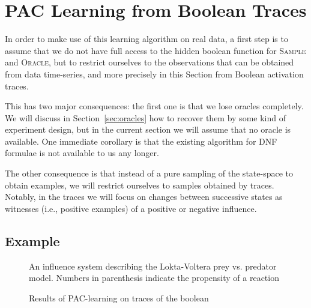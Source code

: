 \documentclass{llncs}
\newcommand{\sylvain}[1]{\textcolor{green}{#1}}
\begin{document}




\section{PAC Learning from Boolean Traces}

In order to make use of this learning algorithm on real data, a first step is
to assume that we do not have full access to the hidden boolean function for
\textsc{Sample} and \textsc{Oracle}, but to restrict ourselves to the observations that can be obtained from data time-series,
and more precisely in this Section from Boolean activation traces.

This has two major consequences: the first one is that we lose oracles
completely. We will discuss in Section~\ref{sec:oracles} how to recover them
by some kind of experiment design, but in the current section we will assume
that no oracle is available. One immediate corollary is that the existing
algorithm for DNF formulae is not available to us any longer.

The other consequence is that instead of a pure sampling of the state-space to
obtain examples, we will restrict ourselves to samples obtained by traces.
Notably, in the traces we will focus on changes between successive states as
witnesses (i.e., positive examples) of a positive or negative influence.

\subsection{Example}

\begin{figure}[htbp]
	
	\vspace{-1em}
	\caption{An influence system describing the Lokta-Voltera prey vs. predator model. Numbers in parenthesis indicate the propensity of a reaction\label{bool-LV}}
\end{figure}
\begin{figure}[htbp]
	
	\vspace{-1em}
	\caption{Results of PAC-learning on traces of the boolean\label{bool-LV.res}}
\end{figure}
\end{document}
